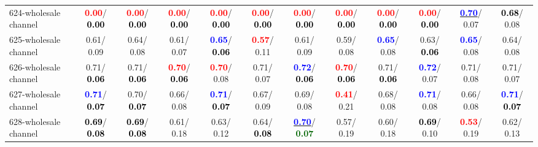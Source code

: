 \begin{table}[h]
\begin{center}
{\begin{tabular}{lc|c|c|c|c|c|c|c|c|c|c}
624-wholesale channel & \textcolor{red}{\textbf{  0.00}}/\textcolor{black}{\textbf{  0.00}} & \textcolor{red}{\textbf{  0.00}}/\textcolor{black}{\textbf{  0.00}} & \textcolor{red}{\textbf{  0.00}}/\textcolor{black}{\textbf{  0.00}} & \textcolor{red}{\textbf{  0.00}}/\textcolor{black}{\textbf{  0.00}} & \textcolor{red}{\textbf{  0.00}}/\textcolor{black}{\textbf{  0.00}} & \textcolor{red}{\textbf{  0.00}}/\textcolor{black}{\textbf{  0.00}} & \textcolor{red}{\textbf{  0.00}}/\textcolor{black}{\textbf{  0.00}} & \textcolor{red}{\textbf{  0.00}}/\textcolor{black}{\textbf{  0.00}} & \textcolor{red}{\textbf{  0.00}}/\textcolor{black}{\textbf{  0.00}} & \underline{\textcolor{blue}{\textbf{  0.70}}}/  0.07 & \textcolor{black}{\textbf{  0.68}}/  0.08 \\
625-wholesale channel &   0.61/  0.09 &   0.64/  0.08 &   0.61/  0.07 & \textcolor{blue}{\textbf{  0.65}}/\textcolor{black}{\textbf{  0.06}} & \textcolor{red}{\textbf{  0.57}}/  0.11 &   0.61/  0.09 &   0.59/  0.08 & \textcolor{blue}{\textbf{  0.65}}/  0.08 &   0.63/\textcolor{black}{\textbf{  0.06}} & \textcolor{blue}{\textbf{  0.65}}/  0.08 &   0.64/  0.08 \\
626-wholesale channel &   0.71/\textcolor{black}{\textbf{  0.06}} &   0.71/\textcolor{black}{\textbf{  0.06}} & \textcolor{red}{\textbf{  0.70}}/\textcolor{black}{\textbf{  0.06}} & \textcolor{red}{\textbf{  0.70}}/  0.08 &   0.71/  0.07 & \textcolor{blue}{\textbf{  0.72}}/\textcolor{black}{\textbf{  0.06}} & \textcolor{red}{\textbf{  0.70}}/\textcolor{black}{\textbf{  0.06}} &   0.71/\textcolor{black}{\textbf{  0.06}} & \textcolor{blue}{\textbf{  0.72}}/  0.07 &   0.71/  0.08 &   0.71/  0.07 \\
627-wholesale channel & \textcolor{blue}{\textbf{  0.71}}/\textcolor{black}{\textbf{  0.07}} &   0.70/\textcolor{black}{\textbf{  0.07}} &   0.66/  0.08 & \textcolor{blue}{\textbf{  0.71}}/\textcolor{black}{\textbf{  0.07}} &   0.67/  0.09 &   0.69/  0.08 & \textcolor{red}{\textbf{  0.41}}/  0.21 &   0.68/  0.08 & \textcolor{blue}{\textbf{  0.71}}/  0.08 &   0.66/  0.08 & \textcolor{blue}{\textbf{  0.71}}/\textcolor{black}{\textbf{  0.07}} \\
628-wholesale channel & \textcolor{black}{\textbf{  0.69}}/\textcolor{black}{\textbf{  0.08}} & \textcolor{black}{\textbf{  0.69}}/\textcolor{black}{\textbf{  0.08}} &   0.61/  0.18 &   0.63/  0.12 &   0.64/\textcolor{black}{\textbf{  0.08}} & \underline{\textcolor{blue}{\textbf{  0.70}}}/\textcolor{darkgreen}{\textbf{  0.07}} &   0.57/  0.19 &   0.60/  0.18 & \textcolor{black}{\textbf{  0.69}}/  0.10 & \textcolor{red}{\textbf{  0.53}}/  0.19 &   0.62/  0.13 \\

\end{tabular}}
\end{center}
\end{table}
